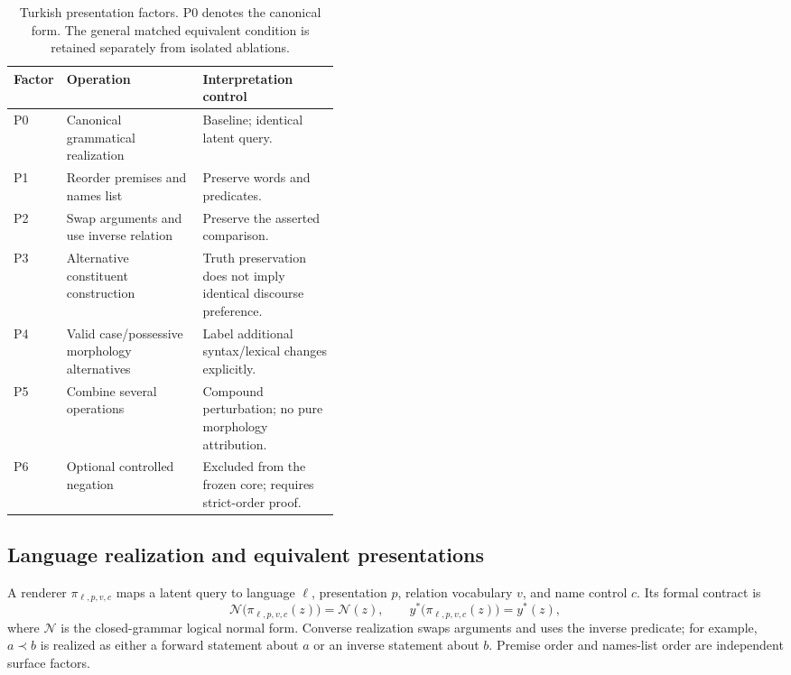 \begin{table}[t]
  \centering
  \caption{Turkish presentation factors. P0 denotes the canonical form. The general matched equivalent
  condition is retained separately from isolated ablations.}
  \label{tab:presentations}
  \small
  \begin{tabular}{@{}llp{0.42\linewidth}@{}}
    \toprule
    Factor & Operation & Interpretation control \\
    \midrule
    P0 & Canonical grammatical realization & Baseline; identical latent query. \\
    P1 & Reorder premises and names list & Preserve words and predicates. \\
    P2 & Swap arguments and use inverse relation & Preserve the asserted comparison. \\
    P3 & Alternative constituent construction & Truth preservation does not imply identical discourse
         preference. \\
    P4 & Valid case/possessive morphology alternatives & Label additional syntax/lexical changes
         explicitly. \\
    P5 & Combine several operations & Compound perturbation; no pure morphology attribution. \\
    P6 & Optional controlled negation & Excluded from the frozen core; requires strict-order proof. \\
    \bottomrule
  \end{tabular}
\end{table}

\subsection{Language realization and equivalent presentations}

A renderer $\pi_{\ell,p,v,c}$ maps a latent query to language $\ell$, presentation $p$, relation vocabulary
$v$, and name control $c$. Its formal contract is
\begin{equation}
  \mathcal{N}\bigl(\pi_{\ell,p,v,c}(z)\bigr) = \mathcal{N}(z),
  \qquad
  y^{*}\bigl(\pi_{\ell,p,v,c}(z)\bigr) = y^{*}(z),
  \label{eq:contract}
\end{equation}
where $\mathcal{N}$ is the closed-grammar logical normal form. Converse realization swaps arguments and
uses the inverse predicate; for example, $a \prec b$ is realized as either a forward statement about $a$ or
an inverse statement about $b$. Premise order and names-list order are independent surface factors.

